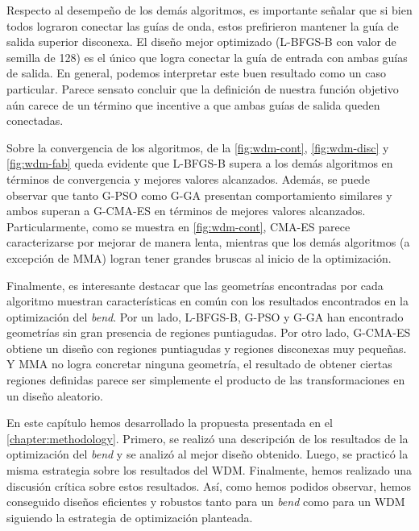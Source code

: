 Respecto al desempeño de los demás algoritmos, es importante señalar que si bien todos lograron
conectar las guías de onda, estos prefirieron mantener la guía de salida superior disconexa.
El diseño mejor optimizado (L-BFGS-B con valor de semilla de 128) es el único que logra conectar
la guía de entrada con ambas guías de salida.
En general, podemos interpretar este buen resultado como un caso particular.
Parece sensato concluir que la definición de nuestra función objetivo aún carece de un
término que incentive a que ambas guías de salida queden conectadas.


Sobre la convergencia de los algoritmos, de la \autoref{fig:wdm-cont}, \autoref{fig:wdm-disc}
y \autoref{fig:wdm-fab} queda evidente que L-BFGS-B supera a los demás algoritmos en términos
de convergencia y mejores valores alcanzados.
Además, se puede observar que tanto G-PSO como G-GA presentan comportamiento similares y ambos
superan a G-CMA-ES en términos de mejores valores alcanzados.
Particularmente, como se muestra en \autoref{fig:wdm-cont}, CMA-ES parece caracterizarse
por mejorar de manera lenta, mientras que los demás algoritmos (a excepción de MMA) logran tener
grandes bruscas al inicio de la optimización.


Finalmente, es interesante destacar que las geometrías encontradas por cada algoritmo muestran
características en común con los resultados encontrados en la optimización del \emph{bend}.
Por un lado, L-BFGS-B, G-PSO y G-GA han encontrado geometrías sin gran presencia de regiones puntiagudas.
Por otro lado, G-CMA-ES obtiene un diseño con regiones puntiagudas y regiones disconexas muy pequeñas.
Y MMA no logra concretar ninguna geometría, el resultado de obtener ciertas regiones definidas parece
ser simplemente el producto de las transformaciones en un diseño aleatorio.


En este capítulo hemos desarrollado la propuesta presentada en el \autoref{chapter:methodology}.
Primero, se realizó una descripción de los resultados de la optimización del \emph{bend} y 
se analizó al mejor diseño obtenido. 
Luego, se practicó la misma estrategia sobre los resultados del WDM.
Finalmente, hemos realizado una discusión crítica sobre estos resultados.
Así, como hemos podidos observar, hemos conseguido diseños eficientes y robustos tanto para un \emph{bend}
como para un WDM siguiendo la estrategia de optimización planteada.
